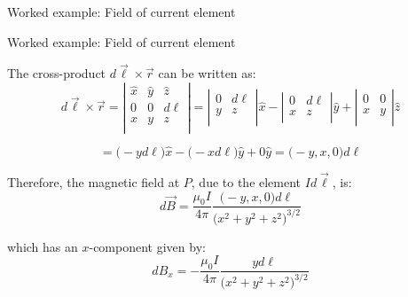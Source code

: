 {\begin{frame}{Worked example: Field of current element}
\end{frame}

%
%
%

\begin{frame}{Worked example: Field of current element}

The cross-product $d\vec{\ell} \times \vec{r}$ can be written as:
\begin{equation*}
  d\vec{\ell} \times \vec{r} =
   \left|
    \begin{array}{ccc}
      \hat{x} & \hat{y} & \hat{z}    \\
            0 &       0 &      d\ell \\
            x &       y &       z    \\
    \end{array}
   \right|
   =
   \left|
    \begin{array}{cc}
            0 &  d\ell \\
            y &   z    \\
    \end{array}
   \right|
   \hat{x} -
   \left|
    \begin{array}{cc}
            0 &  d\ell \\
            x &   z    \\
    \end{array}
   \right|
   \hat{y} +
   \left|
    \begin{array}{cc}
            0 &  0 \\
            x &  y \\
    \end{array}
   \right|
   \hat{z}
\end{equation*}

\begin{equation*}
 = \Big( -y d\ell \Big) \hat{x} - \Big( -x d\ell \Big) \hat{y} + 0 \hat{y}
 = \Big( -y, x, 0 \Big) d\ell
\end{equation*}

Therefore, the magnetic field at $P$, due to the element $Id\vec{\ell}$, is:
\begin{equation*}
  d\vec{B} = \frac{\mu_0I}{4\pi}
    \frac{\Big( -y, x, 0 \Big) d\ell}{\Big(x^2 + y^2 + z^2\Big)^{3/2}}
\end{equation*}

which has an $x$-component given by:
\begin{equation*}
  dB_x = - \frac{\mu_0I}{4\pi}
    \frac{y d\ell}{\Big(x^2 + y^2 + z^2\Big)^{3/2}}
\end{equation*}

\end{frame}

} %



